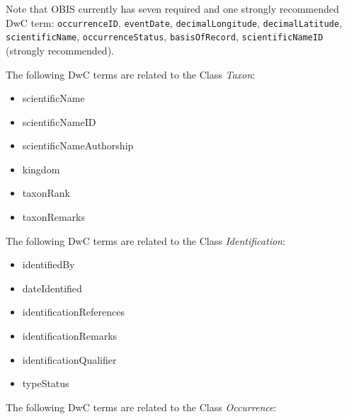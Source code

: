 \documentclass[
  letterpaper,
  DIV=11,
  numbers=noendperiod,
  oneside]{scrreprt}
\providecommand{\tightlist}{%
  \setlength{\itemsep}{0pt}\setlength{\parskip}{0pt}}\usepackage{longtable,booktabs,array}
\begin{document}
Note that OBIS currently has seven required and one strongly recommended
DwC term: \texttt{occurrenceID}, \texttt{eventDate},
\texttt{decimalLongitude}, \texttt{decimalLatitude},
\texttt{scientificName}, \texttt{occurrenceStatus},
\texttt{basisOfRecord}, \texttt{scientificNameID} (strongly
recommended).

The following DwC terms are related to the Class \emph{Taxon}:

\begin{itemize}
\tightlist
\item
  scientificName
\item
  scientificNameID
\item
  scientificNameAuthorship
\item
  kingdom
\item
  taxonRank
\item
  taxonRemarks
\end{itemize}

The following DwC terms are related to the Class \emph{Identification}:

\begin{itemize}
\tightlist
\item
  identifiedBy
\item
  dateIdentified
\item
  identificationReferences
\item
  identificationRemarks
\item
  identificationQualifier
\item
  typeStatus
\end{itemize}

The following DwC terms are related to the Class \emph{Occurrence}:
\end{document}
